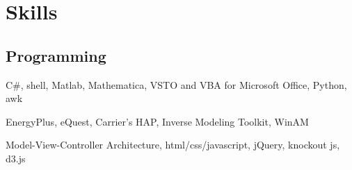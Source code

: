 \documentclass[]{deedy-resume-openfont}
\begin{document}
\begin{minipage}[t]{0.33\textwidth}




\section{Skills}
\subsection{Programming}

C\#, shell, Matlab, Mathematica, VSTO and VBA for Microsoft
Office, Python, awk
\sectionsep

EnergyPlus, eQuest, Carrier's HAP, Inverse Modeling Toolkit, WinAM
\sectionsep

Model-View-Controller Architecture, html/css/javascript, jQuery,
knockout js, d3.js
\sectionsep


\end{minipage}
\end{document}
